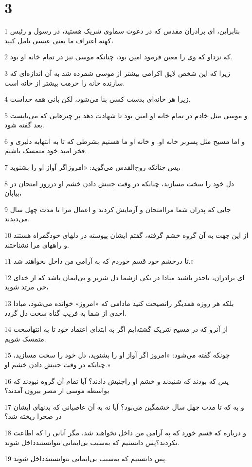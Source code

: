 \chapter{3}

\par 1 بنابراین، ای برادران مقدس که در دعوت سماوی شریک هستید، در رسول و رئیس کهنه اعتراف ما یعنی عیسی تامل کنید،
\par 2 که نزداو که وی را معین فرمود امین بود، چنانکه موسی نیز در تمام خانه او بود.
\par 3 زیرا که این شخص لایق اکرامی بیشتر از موسی شمرده شد به آن اندازه‌ای که سازنده خانه را حرمت بیشتر از خانه است.
\par 4 زیرا هر خانه‌ای بدست کسی بنا می‌شود، لکن بانی همه خداست.
\par 5 و موسی مثل خادم در تمام خانه او امین بود تا شهادت دهد بر چیزهایی که می‌بایست بعد گفته شود.
\par 6 و اما مسیح مثل پسربر خانه او. و خانه او ما هستیم بشرطی که تا به انتهابه دلیری و فخر امید خود متمسک باشیم.
\par 7 پس چنانکه روح‌القدس می‌گوید: «امروزاگر آواز او را بشنوید،
\par 8 دل خود را سخت مسازید، چنانکه در وقت جنبش دادن خشم او درروز امتحان در بیابان،
\par 9 جایی که پدران شما مراامتحان و آزمایش کردند و اعمال مرا تا مدت چهل سال می‌دیدند.
\par 10 از این جهت به آن گروه خشم گرفته، گفتم ایشان پیوسته در دلهای خودگمراه هستند و راههای مرا نشناختند.
\par 11 تا درخشم خود قسم خوردم که به آرامی من داخل نخواهند شد.»
\par 12 ‌ای برادران، باحذر باشید مبادا در یکی ازشما دل شریر و بی‌ایمان باشد که از خدای حی مرتد شوید،
\par 13 بلکه هر روزه همدیگر رانصیحت کنید مادامی که «امروز» خوانده می‌شود، مبادا احدی از شما به فریب گناه سخت دل گردد.
\par 14 از آنرو که در مسیح شریک گشته‌ایم اگر به ابتدای اعتماد خود تا به انتهاسخت متمسک شویم.
\par 15 چونکه گفته می‌شود: «امروز اگر آواز او را بشنوید، دل خود را سخت مسازید، چنانکه در وقت جنبش دادن خشم او.»
\par 16 پس که بودند که شنیدند و خشم او راجنبش دادند؟ آیا تمام آن گروه نبودند که بواسطه موسی از مصر بیرون آمدند؟
\par 17 و به که تا مدت چهل سال خشمگین می‌بود؟ آیا نه به آن عاصیانی که بدنهای ایشان در صحرا ریخته شد؟
\par 18 و درباره که قسم خورد که به آرامی من داخل نخواهند شد، مگر آنانی را که اطاعت نکردند؟پس دانستیم که به‌سبب بی‌ایمانی نتوانستندداخل شوند.
\par 19 پس دانستیم که به‌سبب بی‌ایمانی نتوانستندداخل شوند.

